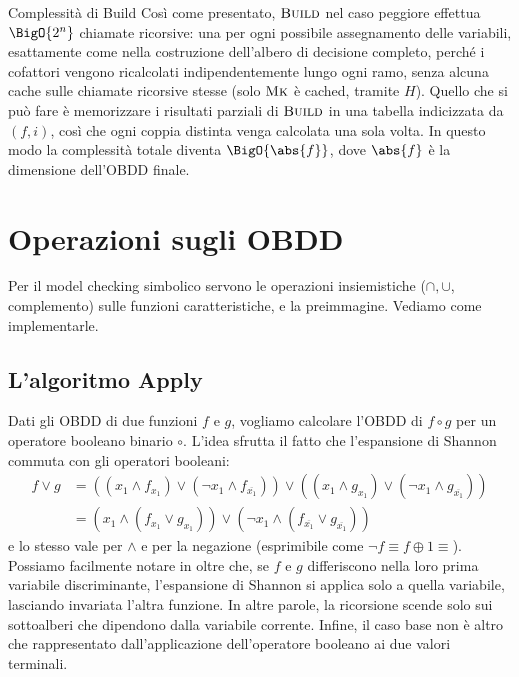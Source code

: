 \begin{observation}{Complessità di Build}
  Così come presentato, \(\textsc{Build}\) nel caso peggiore effettua \(\BigO{2^n}\) chiamate ricorsive: una per ogni possibile assegnamento delle variabili, esattamente come nella costruzione dell'albero di decisione completo, perché i cofattori vengono ricalcolati indipendentemente lungo ogni ramo, senza alcuna cache sulle chiamate ricorsive stesse (solo \(\textsc{Mk}\) è cached, tramite \(H\)). Quello che si può fare è memorizzare i risultati parziali di \(\textsc{Build}\) in una tabella indicizzata da \((f,i)\), così che ogni coppia distinta venga calcolata una sola volta. In questo modo la complessità totale diventa \(\BigO{\abs{f}}\), dove \(\abs{f}\) è la dimensione dell'OBDD finale.
\end{observation}


\section{Operazioni sugli OBDD}

Per il model checking simbolico servono le operazioni insiemistiche (\(\cap, \cup\), complemento) sulle funzioni caratteristiche, e la preimmagine. Vediamo come implementarle.

\subsection{L'algoritmo Apply}

Dati gli OBDD di due funzioni \(f\) e \(g\), vogliamo calcolare l'OBDD di \(f \circ g\) per un operatore booleano binario \(\circ\). L'idea sfrutta il fatto che l'espansione di Shannon commuta con gli operatori booleani:
\begin{equation*}
  \begin{aligned}
    f \lor g & = ((x_1 \land f_{x_1}) \lor (\neg x_1 \land f_{\overline{x_1}})) \lor ((x_1 \land g_{x_1}) \lor (\neg x_1 \land g_{\overline{x_1}})) \\
             & = (x_1 \land (f_{x_1} \lor g_{x_1})) \lor (\neg x_1 \land (f_{\overline{x_1}} \lor g_{\overline{x_1}}))
  \end{aligned}
\end{equation*}
e lo stesso vale per \(\land\) e per la negazione (esprimibile come \(\neg f \equiv f \oplus 1 \equiv\)). Possiamo facilmente notare in oltre che, se \(f\) e \(g\) differiscono nella loro prima variabile discriminante, l'espansione di Shannon si applica solo a quella variabile, lasciando invariata l'altra funzione. In altre parole, la ricorsione scende solo sui sottoalberi che dipendono dalla variabile corrente. Infine, il caso base non è altro che rappresentato dall'applicazione dell'operatore booleano ai due valori terminali.

